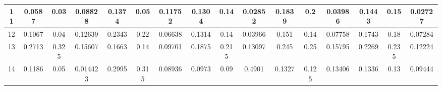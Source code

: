 \begin{table}[htbp]
{\begin{tabular}{@{}cccccccccccccccc@{}}
    \multicolumn{1}{|c|}{11}     & \multicolumn{1}{c|}{\textbf{0.0587}} & \multicolumn{1}{c|}{0.03}           & \multicolumn{1}{c||}{\textbf{0.08828}} & \multicolumn{1}{c|}{\textbf{0.1374}} & \multicolumn{1}{c|}{\textbf{0.05}}  & \multicolumn{1}{c||}{0.11752}          & \multicolumn{1}{c|}{0.1304}          & \multicolumn{1}{c|}{0.14}          & \multicolumn{1}{c||}{\textbf{0.02852}} & \multicolumn{1}{c||}{0.1839}          & \multicolumn{1}{c|}{0.2}            & \multicolumn{1}{c|}{\textbf{0.03986}} & \multicolumn{1}{c|}{0.1443}          & \multicolumn{1}{c|}{0.15}          & \multicolumn{1}{c|}{\textbf{0.02727}} \\ \midrule
    \multicolumn{1}{|c|}{12}     & \multicolumn{1}{c|}{0.1067}          & \multicolumn{1}{c|}{0.04}           & \multicolumn{1}{c||}{0.12639}          & \multicolumn{1}{c|}{0.2343}          & \multicolumn{1}{c|}{0.22}           & \multicolumn{1}{c||}{0.06638}          & \multicolumn{1}{c|}{0.1314}          & \multicolumn{1}{c|}{0.14}          & \multicolumn{1}{c||}{0.03966}          & \multicolumn{1}{c||}{0.151}           & \multicolumn{1}{c|}{0.14}           & \multicolumn{1}{c|}{0.07758}          & \multicolumn{1}{c|}{0.1743}          & \multicolumn{1}{c|}{0.18}          & \multicolumn{1}{c|}{0.07284}          \\ \midrule
    \multicolumn{1}{|c|}{13}     & \multicolumn{1}{c|}{0.2713}          & \multicolumn{1}{c|}{0.325}          & \multicolumn{1}{c||}{0.15607}          & \multicolumn{1}{c|}{0.1663}          & \multicolumn{1}{c|}{0.14}           & \multicolumn{1}{c||}{0.09701}          & \multicolumn{1}{c|}{0.1875}          & \multicolumn{1}{c|}{0.215}         & \multicolumn{1}{c||}{0.13097}          & \multicolumn{1}{c||}{0.245}           & \multicolumn{1}{c|}{0.25}           & \multicolumn{1}{c|}{0.15795}          & \multicolumn{1}{c|}{0.2269}          & \multicolumn{1}{c|}{0.235}         & \multicolumn{1}{c|}{0.12224}          \\ \midrule
    \multicolumn{1}{|c|}{14}     & \multicolumn{1}{c|}{0.1186}          & \multicolumn{1}{c|}{0.05}           & \multicolumn{1}{c||}{0.014423}         & \multicolumn{1}{c|}{0.2995}          & \multicolumn{1}{c|}{0.315}          & \multicolumn{1}{c||}{0.08936}          & \multicolumn{1}{c|}{0.0973}          & \multicolumn{1}{c|}{0.09}          & \multicolumn{1}{c||}{0.4901}           & \multicolumn{1}{c||}{0.1327}          & \multicolumn{1}{c|}{0.125}          & \multicolumn{1}{c|}{0.13406}          & \multicolumn{1}{c|}{0.1336}          & \multicolumn{1}{c|}{0.13}          & \multicolumn{1}{c|}{0.09444}          \\ \midrule

\end{tabular}}
\end{table}
